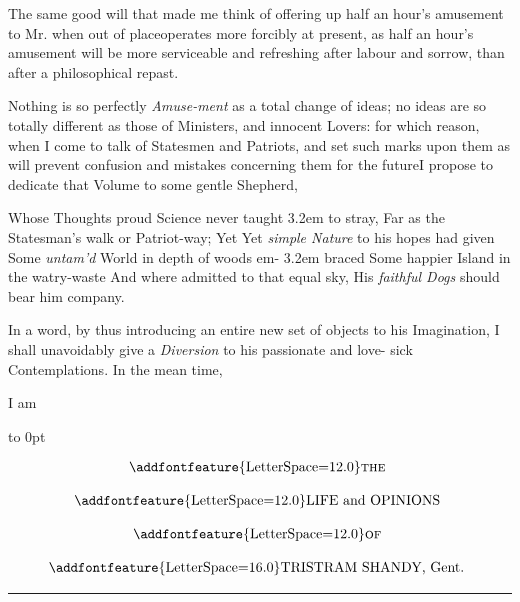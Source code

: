 \documentclass{article}
\begin{document}
The same good will that made me 
think of offering up half an hour’s
amusement to Mr.\@ {} when out of
place\tsk operates more forcibly at
present, as half an hour’s amusement
will be more serviceable and 
refreshing after labour and sorrow,
than after a philosophical repast.

Nothing is so perfectly \textit{Amuse-\break ment}
as a total change of ideas; no
ideas are so totally different as those
of Ministers, and innocent Lovers:
for which reason, when I come to 
talk of Statesmen and Patriots, and 
set such marks upon them as will
prevent confusion and mistakes concerning 
them for the future\tsk I propose
to dedicate that Volume to some
gentle Shepherd,

\smallskip\etp
\bgroup\fontsize{9}{12}\selectfont\parindent1pt\parskip0pt\obeylines
Whose Thoughts proud Science never taught
\noindent\kern 3.2em to stray,
Far as the Statesman’s walk or Patriot-way;
\noindent\hfill Yet
Yet \textit{simple Nature} to his hopes had given
Some \textit{untam’d} World in depth of woods em-
\noindent\kern 3.2em braced\tsk
Some happier Island in the watry-waste\tsk
And where admitted to that equal sky,
His \textit{faithful Dogs} should bear him company.
\egroup

In a word, by thus introducing an
entire new set of objects to his 
Imagi\-nation, I shall unavoidably give a\break
\textit{Diversion} to his passionate and love-\break
sick Contemplations. In the mean\break
time, 

\smallskip

\centerline{I am}

\bigskip 

\egroup


\newpage\null
\setcounter{page}{1}
\pagestyle{folio}
\thispagestyle{empty}
\hbox{}\vskip -36pt
\moveright 96pt\vbox to 0pt{\hsize
40pt\vss}

\[\vbox{\openup 12pt\halign{\hss # \hss\cr
\addfontfeature{LetterSpace=12.0}\textsc{the}\cr
\addfontfeature{LetterSpace=12.0}LIFE and OPINIONS\cr
\addfontfeature{LetterSpace=12.0}\textsc{of}\cr
{\addfontfeature{LetterSpace=16.0}TRISTRAM SHANDY}, Gent.\cr}}\]

\vskip 12pt
\hrule

\bigskip
\sloppy
\setlength{\baselineskip}{14pt}  %
\end{document}
